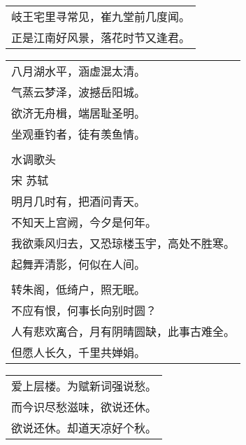 \noindent\begin{minipage}{\linewidth}
  \vskip-3pt\begin{table}[H]
    \centering
    \begin{tabular}{@{}l@{}}
岐王宅里寻常见，崔九堂前几度闻。\\
正是江南好风景，落花时节又逢君。
    \end{tabular}
  \end{table}
\end{minipage}
\vspace{1cm}


\noindent\begin{minipage}{\linewidth}
  \vskip-3pt\begin{table}[H]
    \centering
    \begin{tabular}{@{}l@{}}
八月湖水平，涵虚混太清。\\
气蒸云梦泽，波撼岳阳城。\\
欲济无舟楫，端居耻圣明。\\
坐观垂钓者，徒有羡鱼情。\\
\\
水调歌头\\
宋 苏轼\\
明月几时有，把酒问青天。\\
不知天上宫阙，今夕是何年。\\
我欲乘风归去，又恐琼楼玉宇，高处不胜寒。\\
起舞弄清影，何似在人间。\\
\\
转朱阁，低绮户，照无眠。\\
不应有恨，何事长向别时圆？\\
人有悲欢离合，月有阴晴圆缺，此事古难全。\\
但愿人长久，千里共婵娟。
    \end{tabular}
  \end{table}
\end{minipage}
\vspace{1cm}


\noindent\begin{minipage}{\linewidth}
  \vskip-3pt\begin{table}[H]
    \centering
    \begin{tabular}{@{}l@{}}
爱上层楼。为赋新词强说愁。\\
而今识尽愁滋味，欲说还休。\\
欲说还休。却道天凉好个秋。
    \end{tabular}
  \end{table}
\end{minipage}
\vspace{1cm}


